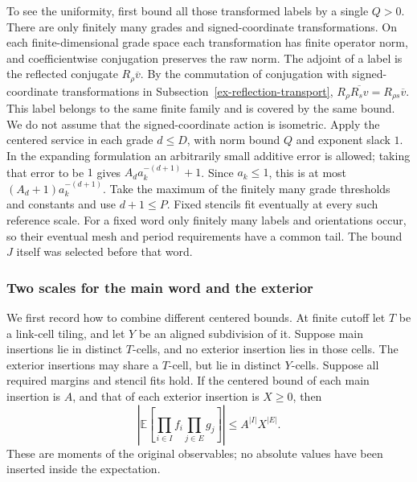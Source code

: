To see the uniformity, first bound all those transformed labels by a
single $Q>0$. There are only finitely many grades and signed-coordinate
transformations. On each finite-dimensional grade space each transformation
has finite operator norm, and coefficientwise conjugation preserves the
raw norm. The adjoint of a label is the reflected conjugate
\(R_\rho\overline v\). By the commutation of conjugation with signed-coordinate
transformations in Subsection~\ref{ex-reflection-transport},
\(R_\rho\overline{R_sv}=R_{\rho s}\overline v\). This label belongs to the
same finite family and is covered by the same bound. We do
not assume that the signed-coordinate action is isometric. Apply the
centered service in each grade $d\leq D$, with norm bound $Q$ and exponent
slack $1$. In the expanding formulation an arbitrarily small additive
error is allowed; taking that error to be $1$ gives
$A_d a_k^{-(d+1)}+1$. Since $a_k\leq1$, this is at most
$(A_d+1)a_k^{-(d+1)}$. Take the maximum of the finitely many grade
thresholds and constants and use $d+1\leq P$. Fixed stencils fit eventually
at every such reference scale. For a fixed word only finitely many labels
and orientations occur, so their eventual mesh and period requirements
have a common tail. The bound $J$ itself was selected before that word.

\subsubsection{Two scales for the main word and the exterior}

We first record how to combine different centered bounds. At finite cutoff
let $T$ be a link-cell tiling, and let $Y$ be an aligned subdivision of it.
Suppose main insertions lie in distinct $T$-cells, and no exterior insertion
lies in those cells. The exterior insertions may share a $T$-cell, but lie
in distinct $Y$-cells. Suppose all required margins and stencil fits hold.
If the centered bound of each main insertion is $A$, and that of each
exterior insertion is $X\geq0$, then
\begin{equation}\label{eq:slab-mixed-cells}
 \left|\mathbb E\left[\prod_{i\in I}f_i\prod_{j\in E}g_j\right]\right|
                 \leq A^{|I|}X^{|E|}.
\end{equation}
These are moments of the original observables; no absolute values have
been inserted inside the expectation.

